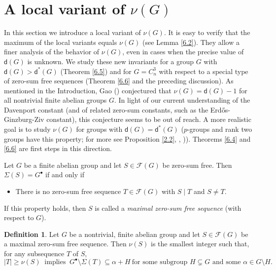 \documentclass[a4paper, 10pt]{amsart}
\theoremstyle{plain}
\theoremstyle{definition}
\newtheorem{definition}[theorem]{\bf Definition}
\numberwithin{equation}{section}
\begin{document}
{\smallskip
\section{A local variant of $\nu (G)$} \label{6}
\smallskip
	
In this section  we introduce a local variant of $\nu (G)$. It is easy to verify that the maximum of the local variants equals $\nu (G)$ (see Lemma \ref{6.2}). They allow a finer analysis of the behavior of $\nu (G)$, even in cases when the precise value of $\mathsf d (G)$ is unknown. We study these new  invariants for a group $G$ with $\mathsf d (G) > \mathsf d^* (G)$ (Theorem \ref{6.5}) and for $G = C_n^3$ with respect to a special type of zero-sum free sequences (Theorem \ref{6.6} and the preceding discussion). 
As mentioned in the Introduction, Gao (\cite[Section 4]{Ga00b}) conjectured that $\nu (G) = \mathsf d (G)-1$ for all nontrivial finite abelian groups $G$. In light of our current understanding of the Davenport constant (and of related zero-sum constants, such as the {E}rd{\H{o}}s-{G}inzburg-{Z}iv constant), this conjecture seems to be out of reach. A more realistic goal is to study $\nu (G)$ for groups with $\mathsf d (G) = \mathsf d^* (G)$ ($p$-groups and rank two groups have this property; for more see Proposition \ref{2.2},  \cite{Bh-SP07a}, \cite[Theorem 3.3.10]{Ge-Gr-Zh26a})). Theorems \ref{6.4} and \ref{6.6} are first steps in this direction. 



\smallskip
Let $G$ be a finite abelian group and let   $S \in \mathcal F (G)$ be zero-sum free. Then $\Sigma (S) =G^{\bullet}$ if and only if 
\begin{itemize}
\item[] There is no zero-sum free sequence $T \in \mathcal F (G)$ with $S \mid T$ and $S \ne T$. 
\end{itemize}
If this  property holds, then $S$ is called a {\it maximal zero-sum free sequence} (with respect to $G$).


\begin{definition} \label{6.1}
Let $G$ be a nontrivial, finite abelian group and let   $S \in \mathcal F (G)$ be a maximal zero-sum free sequence. Then $\nu (S)$ is the smallest integer such that, for any subsequence $T$ of $S$,
\begin{equation} \label{def-nu(S)}
|T|\geq \nu(S)  \ \mbox{ implies } \ G^{\bullet} \setminus \Sigma (T) \subseteq \alpha+H \ \mbox {for some  subgroup $H  \subsetneq  G$ and some $\alpha\in G\setminus H$}.
\end{equation}
\end{definition}


}
\end{document}
